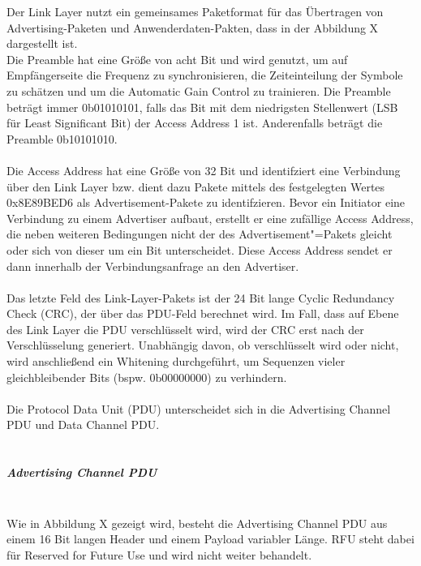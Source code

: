 Der Link Layer nutzt ein gemeinsames Paketformat \cite{BtSpec4.0_2200-2201} für das Übertragen von Advertising-Paketen und Anwenderdaten-Pakten, dass in der Abbildung X
dargestellt ist.\\

Die Preamble hat eine Größe von acht Bit und wird genutzt, um auf Empfängerseite die Frequenz zu synchronisieren, die Zeiteinteilung der Symbole zu schätzen und um die Automatic Gain Control zu trainieren. Die Preamble beträgt immer 0b01010101, falls das Bit mit dem niedrigsten Stellenwert (LSB für Least Significant Bit) der Access Address 1 ist. Anderenfalls beträgt die Preamble 0b10101010.
\\\\
Die Access Address hat eine Größe von 32 Bit und identifziert eine Verbindung über den Link Layer bzw. dient dazu Pakete mittels des festgelegten Wertes 0x8E89BED6 als Advertisement-Pakete zu identifzieren. Bevor ein Initiator eine Verbindung zu einem Advertiser aufbaut, erstellt er eine zufällige Access Address, die neben weiteren Bedingungen nicht der des Advertisement"=Pakets gleicht oder sich von dieser um ein Bit unterscheidet. Diese Access Address sendet er dann innerhalb der Verbindungsanfrage an den Advertiser.
\\\\
Das letzte Feld des Link-Layer-Pakets ist der 24 Bit lange Cyclic Redundancy Check (CRC), der über das PDU-Feld berechnet wird. Im Fall, dass auf Ebene des Link Layer die PDU verschlüsselt wird, wird der CRC erst nach der Verschlüsselung generiert. Unabhängig davon, ob verschlüsselt wird oder nicht, wird anschließend ein Whitening \cite{BtSpec4.0_2217-2218} durchgeführt, um Sequenzen vieler gleichbleibender Bits (bspw. 0b00000000) zu verhindern.
\\\\
Die Protocol Data Unit (PDU) unterscheidet sich in die Advertising Channel PDU und Data Channel PDU.
\\\\

\subparagraph{Advertising Channel PDU} \mbox{} \vspace{0.2cm} \\
Wie in Abbildung X 
gezeigt wird, besteht die Advertising Channel PDU \cite{BtSpec4.0_2201-2208} aus einem 16 Bit langen Header und einem Payload variabler Länge. RFU steht dabei für Reserved for Future Use und wird nicht weiter behandelt.

